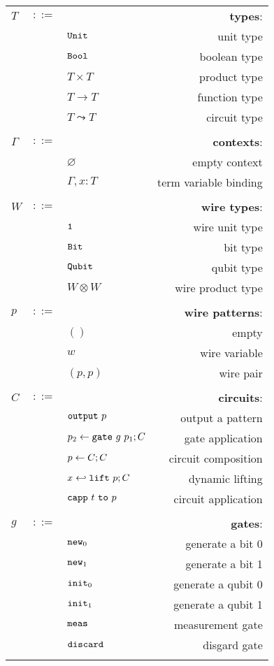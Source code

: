 \documentclass[12pt]{article}
\begin{document}
\begin{longtable}[c]{lclr}
  $T$ &$::=$ &  &\textbf{types}: \\
      & &$\mathtt{Unit}$ &unit type\\
      & &$\mathtt{Bool}$ &boolean type \\
      & &$T\times T$ &product type\\
      & &$T\to T$ &function type\\
      & &$T\leadsto T$ &circuit type\\
  \\

  $\Gamma$ &$::=$ &  &\textbf{contexts}: \\
      & &$\varnothing$ &empty context\\
      & &$\Gamma,x:T$ &term variable binding\\
  \\


  $W$ &$::=$ &  &\textbf{wire types}: \\
      & &$\mathtt{1}$ &wire unit type\\
      & &$\mathtt{Bit}$ &bit type \\
      & &$\mathtt{Qubit}$ &qubit type \\
      & &$W \otimes W$ &wire product type \\
  \\

  $p$ &$::=$ &  &\textbf{wire patterns}: \\
      & &$()$ &empty\\
      & &$w$ &wire variable \\
      & &$(p,p)$ &wire pair \\
  \\

  $C$ &$::=$ &  &\textbf{circuits}: \\
      & &$\toutput\ p$ &output a pattern \\
      & &$p_2 \leftarrow \mathtt{gate}\ g\ p_1 ; C$ &gate application \\
      & &$p \leftarrow C ; C$ &circuit composition \\
      & &$x \hookleftarrow \mathtt{lift}\ p ; C$ &dynamic lifting \\
      & &$\capp\ t\ \mathtt{to}\  p$ &circuit application \\
  \\

  $g$ &$::=$ &  &\textbf{gates}: \\
      & &$\mathtt{new}_0$ &generate a bit 0 \\
      & &$\mathtt{new}_1$ &generate a bit 1 \\
      & &$\mathtt{init}_0$ &generate a qubit 0 \\
      & &$\mathtt{init}_1$ &generate a qubit 1 \\
      & &$\mathtt{meas}$ &measurement gate \\
      & &$\mathtt{discard}$ &disgard gate \\
  \\


\end{longtable}
\end{document}
